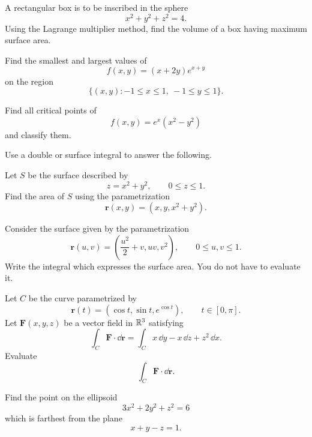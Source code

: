 \begin{problem}
A rectangular box is to be inscribed in the sphere
\[
x^2+y^2+z^2=4.
\]
Using the Lagrange multiplier method, find the volume of a box having maximum surface area.
\end{problem}

\begin{problem}
Find the smallest and largest values of
\[
f(x,y)=(x+2y)e^{x+y}
\]
on the region
\[
\{(x,y):-1\le x\le1,\ -1\le y\le1\}.
\]
\end{problem}

\begin{problem}
Find all critical points of
\[
f(x,y)=e^x(x^2-y^2)
\]
and classify them.
\end{problem}

\begin{problem}
Use a double or surface integral to answer the following.
\begin{problemsubparts}
\item Let $S$ be the surface described by
\[
z=x^2+y^2,
\qquad
0\le z\le1.
\]
Find the area of $S$ using the parametrization
\[
\mathbf r(x,y)=(x,y,x^2+y^2).
\]
\item Consider the surface given by the parametrization
\[
\mathbf r(u,v)=\left(\frac{u^2}{2}+v,uv,v^2\right),
\qquad
0\le u,v\le1.
\]
Write the integral which expresses the surface area. You do not have to evaluate it.
\end{problemsubparts}
\end{problem}

\begin{problem}
Let $C$ be the curve parametrized by
\[
\mathbf r(t)=(\cos t,\sin t,e^{\cos t}),
\qquad
t\in[0,\pi].
\]
Let $\mathbf F(x,y,z)$ be a vector field in $\mathbb{R}^3$ satisfying
\[
\int_C\mathbf F\cdot\dd\mathbf r
=
\int_C x\,\dd y-x\,\dd z+z^2\,\dd x.
\]
Evaluate
\[
\int_C\mathbf F\cdot\dd\mathbf r.
\]
\end{problem}

\begin{problem}
Find the point on the ellipsoid
\[
3x^2+2y^2+z^2=6
\]
which is farthest from the plane
\[
x+y-z=1.
\]
\end{problem}


